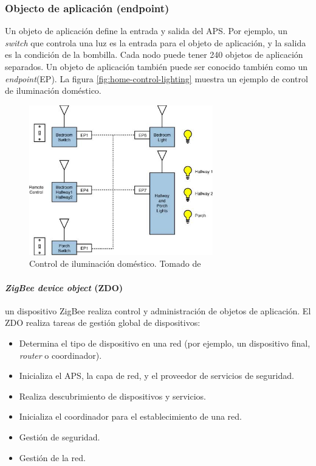\documentclass[10pt,journal,compsoc]{IEEEtran}
\begin{document}
\subsubsection{Objecto de aplicación (endpoint)}
Un objeto de aplicación define la entrada y salida del APS. Por ejemplo, un \emph{switch} que controla una luz es la entrada para el objeto de aplicación, y la salida es la condición de la bombilla. Cada nodo puede tener 240 objetos de aplicación separados. Un objeto de aplicación también puede ser conocido también como un \emph{endpoint}(EP). La figura \ref{fig:home-control-lighting} muestra un ejemplo de control de iluminación doméstico.

\begin{figure}[h]
    \centering
    \includegraphics[width=8cm]{home-controlling-lighting}
    \caption{Control de iluminación doméstico. Tomado de \cite{gshewender}}
    \label{fig:home-control-ligthing}
\end{figure}

\paragraph{\emph{ZigBee device object} (ZDO)} un dispositivo ZigBee realiza control y administración de objetos de aplicación. El ZDO realiza tareas de gestión global de dispositivos:
\begin{itemize}
    \item Determina el tipo de dispositivo en una red (por ejemplo, un dispositivo final, \emph{router} o coordinador).
    \item Inicializa el APS, la capa de red, y el proveedor de servicios de seguridad.
    \item Realiza descubrimiento de dispositivos y servicios.
    \item Inicializa el coordinador para el establecimiento de una red.
    \item Gestión de seguridad.
    \item Gestión de la red.
\end{itemize}
\end{document}
